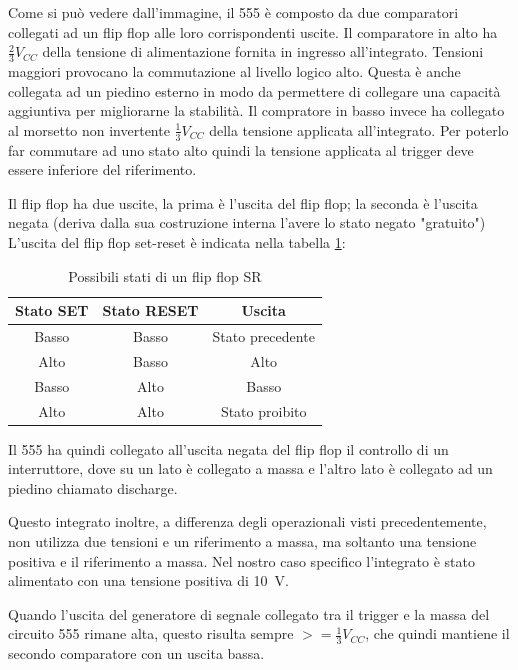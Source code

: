 Come si può vedere dall'immagine, il 555 è composto da due comparatori collegati ad un flip flop alle loro corrispondenti uscite. Il comparatore in alto ha $\frac{2}{3}V_{CC}$ della tensione di alimentazione fornita in ingresso all'integrato. Tensioni maggiori provocano la commutazione al livello logico alto. Questa è anche collegata ad un piedino esterno in modo da permettere di collegare una capacità aggiuntiva per migliorarne la stabilità. Il compratore in basso invece ha collegato al morsetto non invertente $\frac{1}{3}V_{CC}$ della tensione applicata all'integrato. Per poterlo far commutare ad uno stato alto quindi la tensione applicata al trigger deve essere inferiore del riferimento.

Il flip flop ha due uscite, la prima è l'uscita del flip flop; la seconda è l'uscita negata (deriva dalla sua costruzione interna l'avere lo stato negato "gratuito")
L'uscita del flip flop set-reset è indicata nella tabella \ref{tab:flip_flop_states}:

\def\arraystretch{1.3}
\begin{table}[h!]
	\centering
	\begin{tabular}{|c|c|c|}
		\hline
		Stato SET	& Stato RESET & Uscita \\ \hline
		Basso & Basso & Stato precedente  \\ \hline
		Alto & Basso & Alto\\ \hline
		Basso & Alto & Basso\\ \hline
		Alto & Alto & Stato proibito \\ \hline
	\end{tabular}
	\caption{Possibili stati di un flip flop SR}
	\label{tab:flip_flop_states}
\end{table}

Il 555 ha quindi collegato all'uscita negata del flip flop il controllo di un interruttore, dove su un lato è collegato a massa e l'altro lato è collegato ad un piedino chiamato discharge.

\noindent
Questo integrato inoltre, a differenza degli operazionali visti precedentemente, non utilizza due tensioni e un riferimento a massa, ma soltanto una tensione positiva e il riferimento a massa. Nel nostro caso specifico l'integrato è stato alimentato con una tensione positiva di \SI{10}{\volt}.

\noindent
Quando l'uscita del generatore di segnale collegato tra il trigger e la massa del circuito 555 rimane alta, questo risulta sempre $>=\frac{1}{3}V_{CC}$, che quindi mantiene il secondo comparatore con un uscita bassa.

